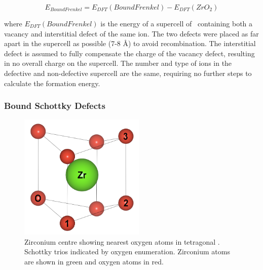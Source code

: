 \begin{equation}
\label{equation_frenkel_bound}
E_{BoundFrenkel} = E_{DFT}(BoundFrenkel) - E_{DFT}(ZrO_2)%
\end{equation}

where $E_{DFT}(BoundFrenkel)$ is the energy of a supercell of \zirconia\ containing both a vacancy and interstitial defect of the same ion. The two defects were placed as far apart in the supercell as possible (7-8 \r{A}) to avoid recombination. The interstitial defect is assumed to fully compensate the charge of the vacancy defect, resulting in no overall charge on the supercell. The number and type of ions in the defective and non-defective supercell are the same, requiring no further steps to calculate the formation energy.

\subsubsection*{Bound Schottky Defects}


\begin{figure}[htp] %
\centering
\includegraphics[height=6cm]{images/zr_centre_tet.png}
\caption{Zirconium centre showing nearest oxygen atoms in tetragonal \zirconia. Schottky trios indicated by oxygen enumeration. Zirconium atoms are shown in green and oxygen atoms in red.}
\label{figure:tetschottky}
\end{figure}

